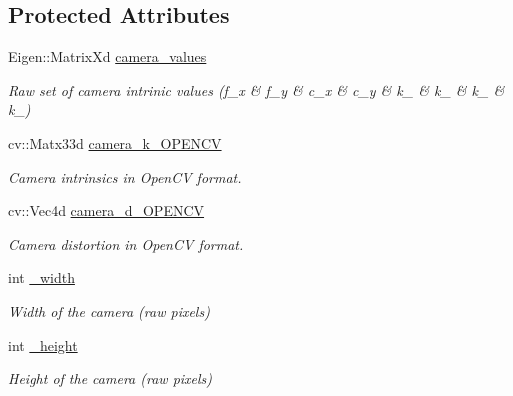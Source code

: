 \subsection*{Protected Attributes}
\begin{DoxyCompactItemize}
\item 
\mbox{\label{classov__core_1_1CamBase_a3b9b353487071aef189fc5bc313dab5d}} 
Eigen\+::\+Matrix\+Xd \hyperlink{classov__core_1_1CamBase_a3b9b353487071aef189fc5bc313dab5d}{camera\+\_\+values}
\begin{DoxyCompactList}\small\item\em Raw set of camera intrinic values (f\+\_\+x \& f\+\_\+y \& c\+\_\+x \& c\+\_\+y \& k\+\_ \& k\+\_ \& k\+\_ \& k\+\_) \end{DoxyCompactList}\item 
\mbox{\label{classov__core_1_1CamBase_a867f7b5a903cc2776227c9b16fdde162}} 
cv\+::\+Matx33d \hyperlink{classov__core_1_1CamBase_a867f7b5a903cc2776227c9b16fdde162}{camera\+\_\+k\+\_\+\+O\+P\+E\+N\+CV}
\begin{DoxyCompactList}\small\item\em Camera intrinsics in Open\+CV format. \end{DoxyCompactList}\item 
\mbox{\label{classov__core_1_1CamBase_a5783a122e28281c1cd72a23f4bee212c}} 
cv\+::\+Vec4d \hyperlink{classov__core_1_1CamBase_a5783a122e28281c1cd72a23f4bee212c}{camera\+\_\+d\+\_\+\+O\+P\+E\+N\+CV}
\begin{DoxyCompactList}\small\item\em Camera distortion in Open\+CV format. \end{DoxyCompactList}\item 
\mbox{\label{classov__core_1_1CamBase_aa7b9e38e6da0ee85af5f82c3bc3ea91d}} 
int \hyperlink{classov__core_1_1CamBase_aa7b9e38e6da0ee85af5f82c3bc3ea91d}{\+\_\+width}
\begin{DoxyCompactList}\small\item\em Width of the camera (raw pixels) \end{DoxyCompactList}\item 
\mbox{\label{classov__core_1_1CamBase_aa9d833d887ee0ca92044e72d788c54de}} 
int \hyperlink{classov__core_1_1CamBase_aa9d833d887ee0ca92044e72d788c54de}{\+\_\+height}
\begin{DoxyCompactList}\small\item\em Height of the camera (raw pixels) \end{DoxyCompactList}\end{DoxyCompactItemize}


